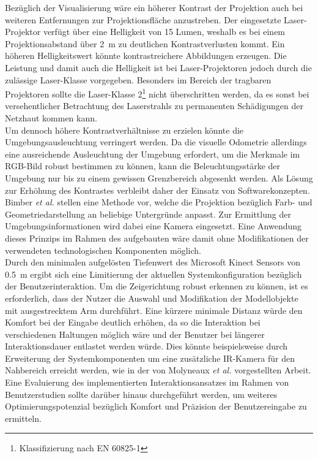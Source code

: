 Bezüglich der Visualisierung wäre ein höherer Kontrast der Projektion auch bei weiteren Entfernungen zur Projektionsfläche anzustreben. Der eingesetzte Laser-Projektor verfügt über eine Helligkeit von 15 Lumen, weshalb es bei einem Projektionsabstand über \SI{2}{\meter} zu deutlichen Kontrastverlusten kommt. Ein höheren Helligkeitswert könnte kontrastreichere Abbildungen erzeugen. Die Leistung und damit auch die Helligkeit ist bei Laser-Projektoren jedoch durch die zulässige Laser-Klasse vorgegeben. Besonders im Bereich der tragbaren Projektoren sollte die Laser-Klasse 2\footnote{Klassifizierung nach EN 60825-1} nicht überschritten werden, da es sonst bei versehentlicher Betrachtung des Laserstrahls zu permanenten Schädigungen der Netzhaut kommen kann.\\

Um dennoch höhere Kontrastverhältnisse zu erzielen könnte die Umgebungsausleuchtung verringert werden. Da die visuelle Odometrie allerdings eine ausreichende Ausleuchtung der Umgebung erfordert, um die Merkmale im RGB-Bild robust bestimmen zu können, kann die Beleuchtungsstärke der Umgebung nur bis zu einem gewissen Grenzbereich abgesenkt werden. Als Lösung zur Erhöhung des Kontrastes verbleibt daher der Einsatz von Softwarekonzepten. Bimber \textit{et al.} stellen eine Methode vor, welche die Projektion bezüglich Farb- und Geometriedarstellung an beliebige Untergründe anpasst. Zur Ermittlung der Umgebungsinformationen wird dabei eine Kamera eingesetzt. Eine Anwendung dieses Prinzips im Rahmen des aufgebauten  wäre damit ohne Modifikationen der verwendeten technologischen Komponenten möglich.\\

Durch den minimalen aufgelösten Tiefenwert des Microsoft Kinect Sensors von \SI{0,5}{\meter} ergibt sich eine Limitierung der aktuellen Systemkonfiguration bezüglich der Benutzerinteraktion. Um die Zeigerichtung robust erkennen zu können, ist es erforderlich, dass der Nutzer die Auswahl und Modifikation der Modellobjekte mit ausgestrecktem Arm durchführt. Eine kürzere minimale Distanz würde den Komfort bei der Eingabe deutlich erhöhen, da so die Interaktion bei verschiedenen Haltungen möglich wäre und der Benutzer bei längerer Interaktionsdauer entlastet werden würde. Dies könnte beispielsweise durch Erweiterung der Systemkomponenten um eine zusätzliche IR-Kamera für den Nahbereich erreicht werden, wie in der von Molyneaux \textit{et al.} \cite{Molyneaux2012} vorgestellten Arbeit. Eine Evaluierung des implementierten Interaktionsansatzes im Rahmen von Benutzerstudien sollte darüber hinaus durchgeführt werden, um weiteres Optimierungspotenzial bezüglich Komfort und Präzision der Benutzereingabe zu ermitteln.\\


